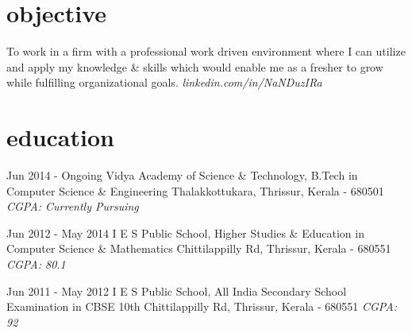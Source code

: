 \documentclass[]{friggeri-cv}
\begin{document}
	
\newline

\section{objective}
\begin{entrylist}

	\entry
	{}
    {{\normalfont To work in a firm with a professional work driven environment where I can utilize and apply my knowledge \& skills which would enable me as a fresher to grow while fulfilling organizational goals.}}
    {\emph{linkedin.com/in/NaNDuzIRa}}
	{}
\end{entrylist}
\newline

\section{education}
\begin{entrylist}
	
	\entry
	{Jun 2014 - Ongoing}
	{Vidya Academy of Science \& Technology, {\normalfont B.Tech in Computer Science \& Engineering \newline}}
	{Thalakkottukara, Thrissur, Kerala - 680501}
	{\emph{CGPA: Currently Pursuing}}
	  
	
	\entry
	{Jun 2012 - May 2014}
	{I E S Public School, {\normalfont Higher Studies \& Education in Computer Science \& Mathematics \newline}}
	{Chittilappilly Rd, Thrissur, Kerala - 680551}
	{\emph{CGPA: 80.1}}
    
    
	\entry
	{Jun 2011 - May 2012}
	{I E S Public School, {\normalfont All India Secondary School Examination in CBSE 10th \newline }}
	{Chittilappilly Rd, Thrissur, Kerala - 680551}
	{\emph{CGPA: 92}}
	  
\end{entrylist}
\newline
\end{document}
